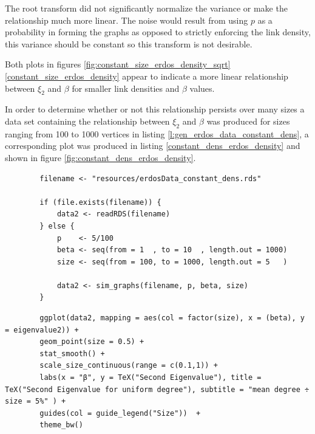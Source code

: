 \documentclass[11pt]{report}
\begin{document}
The root transform did not significantly normalize the variance or make the
relationship much more linear. The noise would result from using \(p\) as a
probability in forming the graphs as opposed to strictly enforcing the link
density, this variance should be constant so this transform is not desirable.

Both plots in figures
\ref{fig:constant_size_erdos_density_sqrt}
\ref{constant_size_erdos_density}
appear to indicate a more linear relationship between \(\xi_{2}\) and \(\beta\) for smaller link densities and \(\beta\) values.


In order to determine whether or not this relationship persists over many sizes a data set containing the relationship between \(\xi_{2}\) and \(\beta\) was produced for sizes ranging from 100 to 1000 vertices in listing \ref{l:gen_erdos_data_constant_dens}, a corresponding plot was produced in listing \ref{constant_dens_erdos_density} and shown in figure \ref{fig:constant_dens_erdos_density}.


\begin{listing}[htbp]
    \begin{tcolorbox}
        \begin{verbatim}
        filename <- "resources/erdosData_constant_dens.rds"

        if (file.exists(filename)) {
            data2 <- readRDS(filename)
        } else {
            p    <- 5/100
            beta <- seq(from = 1  , to = 10  , length.out = 1000)
            size <- seq(from = 100, to = 1000, length.out = 5   )

            data2 <- sim_graphs(filename, p, beta, size)
        }
        \end{verbatim}
    \end{tcolorbox}
\caption{\label{l:gen_erdos_data_constant_dens}Produce a data set of a variety of sizes ranging from 100 to 1000 vertices.}
\end{listing}

\begin{listing}[htbp]
    \begin{tcolorbox}
        \begin{verbatim}
        ggplot(data2, mapping = aes(col = factor(size), x = (beta), y = eigenvalue2)) +
        geom_point(size = 0.5) +
        stat_smooth() +
        scale_size_continuous(range = c(0.1,1)) +
        labs(x = "β", y = TeX("Second Eigenvalue"), title = TeX("Second Eigenvalue for uniform degree"), subtitle = "mean degree ÷ size = 5%" ) +
        guides(col = guide_legend("Size"))  +
        theme_bw()
        \end{verbatim}
    \end{tcolorbox}
\caption{\label{constant_dens_erdos_density}listing:constant\textsubscript{size}\textsubscript{erdos}\textsubscript{density}}
\end{listing}
\end{document}
